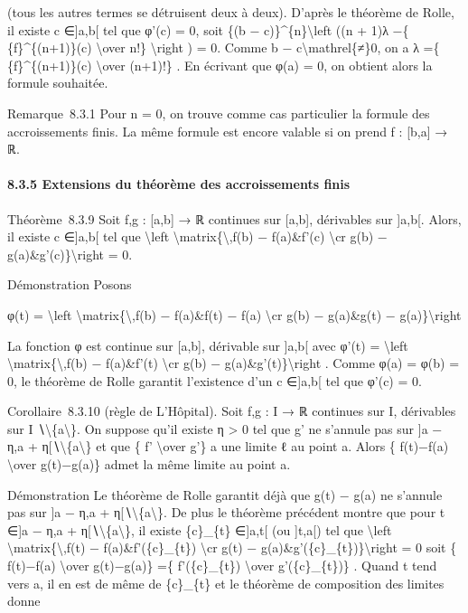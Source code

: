 \documentclass[]{article}
\begin{document}
(tous les autres termes se détruisent deux à deux). D'après le théorème
de Rolle, il existe c ∈{]}a,b{[} tel que φ'(c) = 0, soit \{(b −
c)\}\^{}\{n\}\textbackslash{}left ((n + 1)λ −\{ \{f\}\^{}\{(n+1)\}(c)
\textbackslash{}over n!\} \textbackslash{}right ) = 0. Comme b −
c\textbackslash{}mathrel\{≠\}0, on a λ =\{ \{f\}\^{}\{(n+1)\}(c)
\textbackslash{}over (n+1)!\} . En écrivant que φ(a) = 0, on obtient
alors la formule souhaitée.

Remarque~8.3.1 Pour n = 0, on trouve comme cas particulier la formule
des accroissements finis. La même formule est encore valable si on prend
f : {[}b,a{]} → ℝ.

\paragraph{8.3.5 Extensions du théorème des accroissements finis}

Théorème~8.3.9 Soit f,g : {[}a,b{]} → ℝ continues sur {[}a,b{]},
dérivables sur {]}a,b{[}. Alors, il existe c ∈{]}a,b{[} tel que
\textbackslash{}left
\textbar{}\textbackslash{}matrix\{\textbackslash{},f(b) − f(a)\&f'(c)
\textbackslash{}cr g(b) − g(a)\&g'(c)\}\textbackslash{}right \textbar{}
= 0.

Démonstration Posons

φ(t) = \textbackslash{}left
\textbar{}\textbackslash{}matrix\{\textbackslash{},f(b) − f(a)\&f(t) −
f(a) \textbackslash{}cr g(b) − g(a)\&g(t) − g(a)\}\textbackslash{}right
\textbar{}

La fonction φ est continue sur {[}a,b{]}, dérivable sur {]}a,b{[} avec
φ'(t) = \textbackslash{}left
\textbar{}\textbackslash{}matrix\{\textbackslash{},f(b) − f(a)\&f'(t)
\textbackslash{}cr g(b) − g(a)\&g'(t)\}\textbackslash{}right \textbar{}.
Comme φ(a) = φ(b) = 0, le théorème de Rolle garantit l'existence d'un c
∈{]}a,b{[} tel que φ'(c) = 0.

Corollaire~8.3.10 (règle de L'Hôpital). Soit f,g : I → ℝ continues sur
I, dérivables sur I ∖\textbackslash{}\{a\textbackslash{}\}. On suppose
qu'il existe η \textgreater{} 0 tel que g' ne s'annule pas sur {]}a −
η,a + η{[}∖\textbackslash{}\{a\textbackslash{}\} et que \{ f'
\textbackslash{}over g'\} a une limite ℓ au point a. Alors \{ f(t)−f(a)
\textbackslash{}over g(t)−g(a)\} admet la même limite au point a.

Démonstration Le théorème de Rolle garantit déjà que g(t) − g(a) ne
s'annule pas sur {]}a − η,a +
η{[}∖\textbackslash{}\{a\textbackslash{}\}. De plus le théorème
précédent montre que pour t ∈{]}a − η,a +
η{[}∖\textbackslash{}\{a\textbackslash{}\}, il existe \{c\}\_\{t\}
∈{]}a,t{[} (ou {]}t,a{[}) tel que \textbackslash{}left
\textbar{}\textbackslash{}matrix\{\textbackslash{},f(t) −
f(a)\&f'(\{c\}\_\{t\}) \textbackslash{}cr g(t) −
g(a)\&g'(\{c\}\_\{t\})\}\textbackslash{}right \textbar{} = 0 soit \{
f(t)−f(a) \textbackslash{}over g(t)−g(a)\} =\{ f'(\{c\}\_\{t\})
\textbackslash{}over g'(\{c\}\_\{t\})\} . Quand t tend vers a, il en est
de même de \{c\}\_\{t\} et le théorème de composition des limites donne
\end{document}

